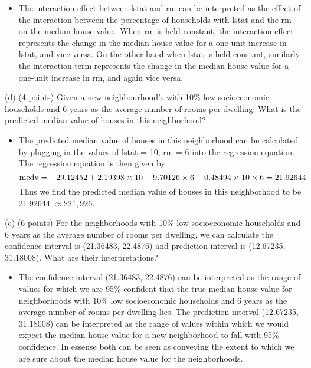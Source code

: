 \documentclass[
]{article}
\begin{document}
\begin{enumerate}
\begin{itemize}

\item The interaction effect between lstat and rm can be interpreted as the effect of the interaction between the percentage of households with lstat and the rm on the median house value. When rm is held constant, the interaction effect represents the change in the median house value for a one-unit increase in lstat, and vice versa. On the other hand when lstat is held constant, similarly the interaction term represents the change in the median house value for a one-unit increase in rm, and again vice versa.
\end{itemize}

(d) (4 points) Given a new neighbourhood’s with 10\% low socioeconomic households and 6 years as the average number of rooms per dwelling. What is the predicted median value of houses in this neighborhood? 
\begin{itemize}
\item The predicted median value of houses in this neighborhood can be calculated by plugging in the values of lstat = 10, rm = 6 into the regression equation. The regression equation is then given by 
$$
\text{medv} = -29.12452 + 2.19398 \times 10 + 9.70126 \times 6 - 0.48494 \times 10 \times 6 \\
= 21.92644
$$
Thus we find the predicted median value of houses in this neighborhood to be 21.92644 $\approx \$21,926$.
\end{itemize}
(e) (6 points) For the neighborhoods with 10\% low socioeconomic households and 6 years as the average number of rooms per dwelling, we can calculate the confidence interval is (21.36483, 22.4876) and prediction interval is (12.67235, 31.18008). What are their interpretations?
\begin{itemize}
\item The confidence interval (21.36483, 22.4876) can be interpreted as the range of values for which we are 95\% confident that the true median house value for neighborhoods with 10\% low socioeconomic households and 6 years as the average number of rooms per dwelling lies. The prediction interval (12.67235, 31.18008) can be interpreted as the range of values within which we would expect the median house value for a new neighborhood to fall with 95\% confidence. In essense both can be seen as conveying the extent to which we are sure about the median house value for the neighborhoods.
\end{itemize}


\end{enumerate}
\end{document}

